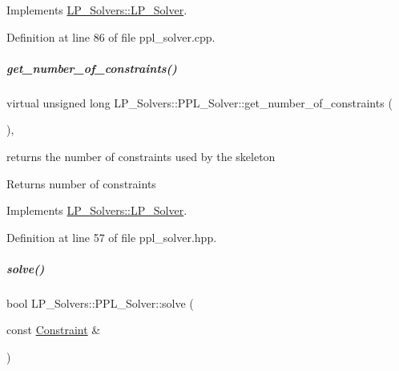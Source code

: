 Implements \hyperlink{group___c_l_s_solvers_a36c14a88e9d3ae9d9321acc7877236d0}{L\+P\+\_\+\+Solvers\+::\+L\+P\+\_\+\+Solver}.



Definition at line 86 of file ppl\+\_\+solver.\+cpp.

\mbox{\label{group___c_l_s_solvers_a8c8dbe226a971e62159888aecacce458}} 
\subparagraph{\texorpdfstring{get\+\_\+number\+\_\+of\+\_\+constraints()}{get\_number\_of\_constraints()}}
{\footnotesize\ttfamily virtual unsigned long L\+P\+\_\+\+Solvers\+::\+P\+P\+L\+\_\+\+Solver\+::get\+\_\+number\+\_\+of\+\_\+constraints (\begin{DoxyParamCaption}{ }\end{DoxyParamCaption})\hspace{0.3cm}{\ttfamily [inline]}, {\ttfamily [virtual]}}



returns the number of constraints used by the skeleton 

\begin{DoxyReturn}{Returns}
number of constraints 
\end{DoxyReturn}


Implements \hyperlink{group___c_l_s_solvers_a05697a4527b15e26b5e0ae9088a46ed5}{L\+P\+\_\+\+Solvers\+::\+L\+P\+\_\+\+Solver}.



Definition at line 57 of file ppl\+\_\+solver.\+hpp.

\mbox{\label{group___c_l_s_solvers_affe1dce30ec7bad7c54e4edf9283235e}} 
\subparagraph{\texorpdfstring{solve()}{solve()}\hspace{0.1cm}{\footnotesize\ttfamily [1/2]}}
{\footnotesize\ttfamily bool L\+P\+\_\+\+Solvers\+::\+P\+P\+L\+\_\+\+Solver\+::solve (\begin{DoxyParamCaption}\item[{const \hyperlink{group___c_l_s_solvers_class_l_p___solvers_1_1_constraint}{Constraint} \&}]{ }\end{DoxyParamCaption})\hspace{0.3cm}{\ttfamily [virtual]}}



